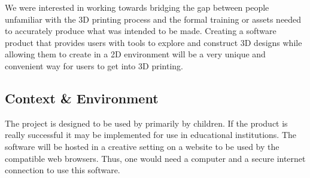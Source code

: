 \documentclass[12pt]{article}
\begin{document}
\noindent We were interested in working towards bridging the gap between people unfamiliar with the 3D printing process and the formal training or assets needed to accurately produce what was intended to be made.  Creating a software product that provides users with tools to explore and construct 3D designs while allowing them to create in a 2D environment will be a very unique and convenient way for users to get into 3D printing.


\subsection*{Context \& Environment}
The project is designed to be used by primarily by children.  If the product is really successful it may be implemented for use in educational institutions.  The software will be hosted in a creative setting on a website to be used by the compatible web browsers.  Thus, one would need a computer and a secure internet connection to use this software.


 
\end{document}
